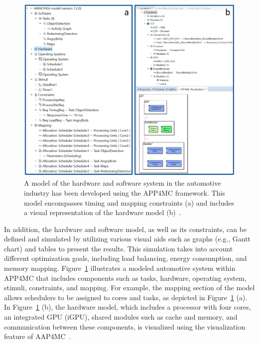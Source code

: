 \begin{figure}[ht]
\centering
\includegraphics[width= \columnwidth]{source/app4mc11_cropped.pdf}
\caption{A model of the hardware and software system in the automotive industry has been developed using the APP4MC framework. This model encompasses timing and mapping constraints (a) and includes a visual representation of the hardware model (b)~\cite{askaripoor2022architecture}.}
\label{fig66}
\end{figure}

In addition, the hardware and software model, as well as its constraints, can be defined and simulated by utilizing various visual aids such as graphs (e.g., Gantt chart) and tables to present the results. This simulation takes into account different optimization goals, including load balancing, energy consumption, and memory mapping.
Figure~\ref{fig66} illustrates a modeled automotive system within APP4MC that includes components such as tasks, hardware, operating system, stimuli, constraints, and mapping. For example, the mapping section of the model allows schedulers to be assigned to cores and tasks, as depicted in Figure~\ref{fig66} (a). In Figure~\ref{fig66} (b), the hardware model, which includes a processor with four cores, an integrated GPU (iGPU), shared modules such as cache and memory, and communication between these components, is visualized using the visualization feature of AAP4MC~\cite{askaripoor2022architecture}.




